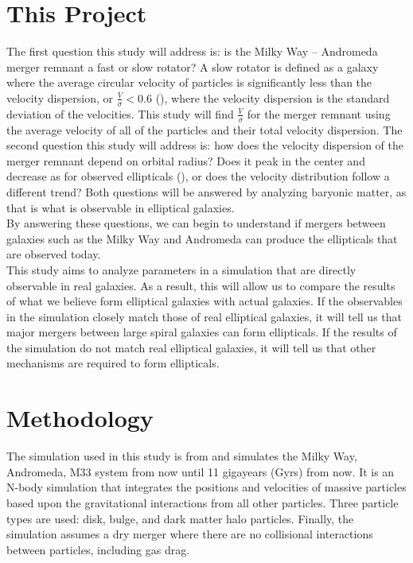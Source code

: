 \documentclass[twocolumn]{aastex63}
\begin{document}
\section{This Project\label{proposal}}

The first question this study will address is: is the Milky Way -- Andromeda merger remnant a fast or slow rotator? A slow rotator is defined as a galaxy where the average circular velocity of particles is significantly less than the velocity dispersion, or $\frac{V}{\sigma}<0.6$ (\cite{sparke2007galaxies}), where the velocity dispersion is the standard deviation of the velocities. This study will find $\frac{V}{\sigma}$ for the merger remnant using the average velocity of all of the particles and their total velocity dispersion. The second question this study will address is: how does the velocity dispersion of the merger remnant depend on orbital radius? Does it peak in the center and decrease as for observed ellipticals (\cite{10.1093/mnras/stt442}), or does the velocity distribution follow a different trend? Both questions will be answered by analyzing baryonic matter, as that is what is observable in elliptical galaxies.\\

By answering these questions, we can begin to understand if mergers between galaxies such as the Milky Way and Andromeda can produce the ellipticals that are observed today.\\

This study aims to analyze parameters in a simulation that are directly observable in real galaxies. As a result, this will allow us to compare the results of what we believe form elliptical galaxies with actual galaxies. If the observables in the simulation closely match those of real elliptical galaxies, it will tell us that major mergers between large spiral galaxies can form ellipticals. If the results of the simulation do not match real elliptical galaxies, it will tell us that other mechanisms are required to form ellipticals.\\

\section{Methodology}

The simulation used in this study is from \cite{2012ApJ...753....8V} and simulates the Milky Way, Andromeda, M33 system from now until 11 gigayears (Gyrs) from now. It is an N-body simulation that integrates the positions and velocities of massive particles based upon the gravitational interactions from all other particles. Three particle types are used: disk, bulge, and dark matter halo particles. Finally, the simulation assumes a dry merger where there are no collisional interactions between particles, including gas drag.\\
\end{document}
